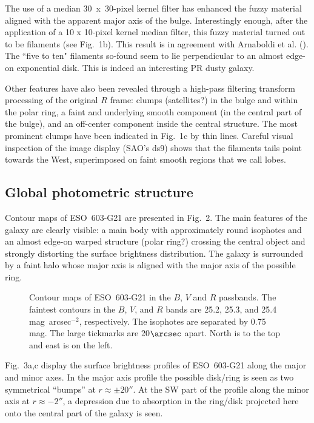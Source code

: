 \documentclass{aa}
\begin{document}
The use of a median 30~x~30-pixel kernel filter has enhanced the fuzzy
material  aligned  with the  apparent  major  axis of the  bulge.
Interestingly  enough,  after  the  application  of  a  10 x
10-pixel  kernel median filter, this fuzzy  material turned out to
be filaments (see Fig.~1b).  This result is in agreement with Arnaboldi
et al.  (\cite{a}).  The ``five to ten" filaments so-found seem to lie
perpendicular to an almost edge-on  exponential  disk.  This is indeed an
interesting PR dusty galaxy.

Other  features  have also been  revealed  through  a  high-pass  filtering
transform  processing of the original $R$ frame:  clumps  (satellites?)  in
the  bulge  and  within  the  polar  ring, a faint  and  underlying  smooth
component (in the central part of the bulge), and an  off-center  component
inside  the  central   structure.  The  most  prominent  clumps  have  been
indicated in Fig.~1c by thin lines.  Careful visual  inspection of the image
display (SAO's ds9) shows that the filaments tails point towards the West,
superimposed on faint smooth regions that we call lobes.

\subsection{Global photometric structure}

Contour  maps  of  ESO~603-G21  are  presented  in  Fig.~2.  The  main
features  of  the  galaxy  are  clearly  visible:  a  main  body  with
approximately  round isophotes and an almost edge-on warped  structure
(polar ring?)  crossing the central object and strongly distorting the
surface brightness  distribution.  The galaxy is surrounded by a faint
halo whose major  axis is  aligned  with  the  major  axis of the
possible ring.

\begin{figure}[!ht]
\caption[2]{Contour  maps  of  ESO~603-G21  in the  $B$,  $V$  and  $R$
passbands.  The  faintest  contours in the $B$, $V$, and $R$ bands are
25.2, 25.3, and 25.4  mag~arcsec$^{-2}$,  respectively.  The isophotes
are separated by 0.75 mag.  The large tickmarks are 20$\arcsec$ apart.
North is to the top and east is on the left.}
\end{figure}


Fig.~3a,c display the surface brightness profiles of ESO~603-G21 along
the major and minor  axes.  In the major  axis  profile  the  possible
disk/ring  is seen as two  symmetrical  ``bumps''  at $r  \approx  \pm
20''$.  At the SW  part  of  the  profile  along  the  minor  axis  at
$r\approx  -2''$, a  depression  due to  absorption  in the  ring/disk
projected here onto the central part of the galaxy is seen.
\end{document}
